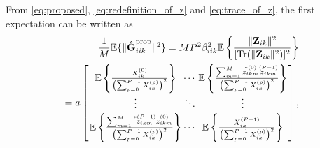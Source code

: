 \documentclass[10pt,journal,comsoc,final]{IEEEtran}
\DeclareMathOperator{\Tr}{Tr}
\begin{document}
From \eqref{eq:proposed}, \eqref{eq:redefinition_of_z} and \eqref{eq:trace_of_z}, the first expectation can be written as
\begin{equation}\label{eq:first_term_expectation}
\begin{split}
\frac{1}{M}\mathbb{E}\{ \lVert \hat{\textbf{G}}_{iik}^{\text{prop}} \rVert^{2} \} = M P^{2} \beta_{iik}^{2} \mathbb{E} \left\lbrace \frac{\lVert \textbf{Z}_{ik} \rVert^2}{ [ \Tr ( \lVert \textbf{Z}_{ik} \rVert^{2} ) ]^{2}  } \right\rbrace \\ = a \arraycolsep=1pt\def\arraystretch{1.5} \left[\begin{array}{ccc}
\mathbb{E} \left\lbrace \frac{ X_{ik}^{(0)} }{ \left( \sum_{p=0}^{P-1} X_{ik}^{(p)} \right)^{2} } \right\rbrace & \cdots & \mathbb{E} \left\lbrace \frac{ \sum_{m=1}^{M}{ \overset{*(0)}{{z}_{ikm}} \overset{(P-1)}{{z}_{ikm}} } }{\left( \sum_{p=0}^{P-1} X_{ik}^{(p)} \right)^{2}} \right\rbrace \\
\vdots & \ddots & \vdots \\ 
\mathbb{E} \left\lbrace \frac{ \sum_{m=1}^{M}{ \overset{*(P-1)}{{z}_{ikm}} \overset{(0)}{{z}_{ikm}} } }{\left( \sum_{p=0}^{P-1} X_{ik}^{(p)} \right)^{2}} \right\rbrace & \cdots & \mathbb{E} \left\lbrace \frac{ X_{ik}^{(P-1)} }{\left( \sum_{p=0}^{P-1} X_{ik}^{(p)} \right)^{2}} \right\rbrace  \end{array} \right],
\end{split}
\end{equation}
\end{document}
